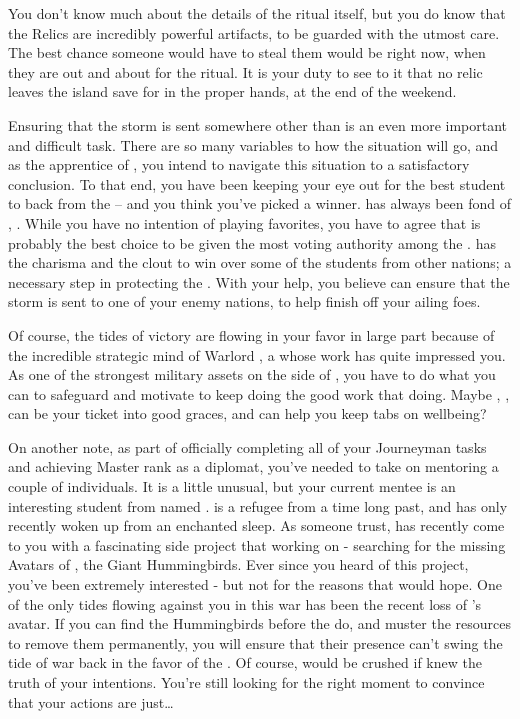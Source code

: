 \documentclass[char]{GL2020}
\begin{document}
You don’t know much about the details of the ritual itself, but you do know that the Relics are incredibly powerful artifacts, to be guarded with the utmost care. The best chance someone would have to steal them would be right now, when they are out and about for the ritual. It is your duty to see to it that no relic leaves the island save for in the proper hands, at the end of the weekend.

Ensuring that the storm is sent somewhere other than \pShip{} is an even more important and difficult task. There are so many variables to how the situation will go, and as the apprentice of \cHeadDiplomat{}, you intend to navigate this situation to a satisfactory conclusion. To that end, you have been keeping your eye out for the best student to back from the \pShip{} -- and you think you’ve picked a winner. \cHeadDiplomat{} has always been fond of \cHeadDiplomat{\their} , \cPresident{}. While you have no intention of playing favorites, you have to agree that \cPresident{} is probably the best choice to be given the most voting authority among the \pShippies{}. \cPresident{} has the charisma and the clout to win over some of the students from other nations; a necessary step in protecting the \pShip{}. With your help, you believe \cPresident{} can ensure that the storm is sent to one of your enemy nations, to help finish off your ailing foes.

Of course, the tides of victory are flowing in your favor in large part because of the incredible strategic mind of Warlord \cLoud{}, a \cLoud{\person} whose work has quite impressed you. As one of the strongest military assets on the side of \pShip{}, you have to do what you can to safeguard and motivate \cLoud{} to keep doing the good work that \cLoud{\they} \cLoud{\are} doing. Maybe \cLoud{\their} \cWarlordDaughter{\child}, \cWarlordDaughter{}, can be your ticket into \cLoud{\their} good graces, and can help you keep tabs on \cLoud{\their} wellbeing?

On another note, as part of officially completing all of your Journeyman tasks and achieving Master rank as a diplomat, you’ve needed to take on mentoring a couple of individuals. It is a little unusual, but your current mentee is an interesting student from \pFarm{} named \cDisney{}. \cDisney{} is a refugee from a time long past, and has only recently woken up from an enchanted sleep. As someone \cDisney{\they} trust\cDisney{\plural}, \cDisney{} has recently come to you with a fascinating side project that \cDisney{\they} \cDisney{\are} working on - searching for the missing Avatars of \cFarmGod{\full}, the Giant Hummingbirds. Ever since you heard of this project, you’ve been extremely interested - but not for the reasons that \cDisney{} would hope. One of the only tides flowing against you in this war has been the recent loss of \pShip{}’s avatar. If you can find the Hummingbirds before the \pFarm{} do, and muster the resources to remove them permanently, you will ensure that their presence can’t swing the tide of war back in the favor of the \pFarm{}. Of course, \cDisney{} would be crushed if \cDisney{\they} knew the truth of your intentions. You’re still looking for the right moment to convince \cDisney{\them} that your actions are just\ldots
\end{document}
